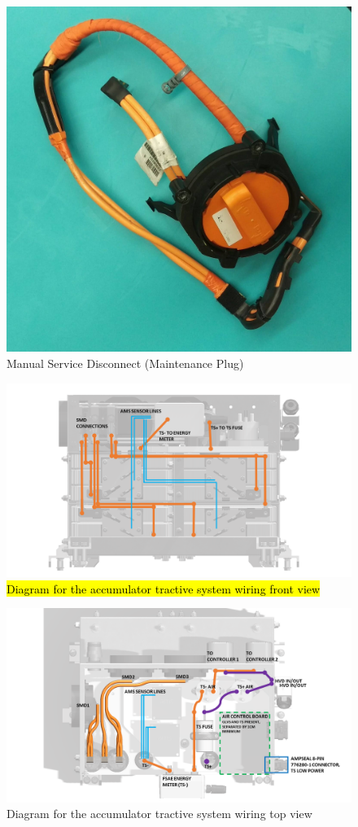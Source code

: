 \documentclass{article}
\DeclareRobustCommand{\hlr}[1]{{\sethlcolor{red}\hl{#1}}}
\begin{document}
            \begin{figure}[H]
                \centering
                \includegraphics[width = 0.5 \textwidth]{msd_highres}
                \caption{Manual Service Disconnect (Maintenance Plug)}
                \label{msd03}
            \end{figure}

            \begin{figure}[H]
                \centering
                \includegraphics[width = 0.5 \textwidth]{TRACTIVE_DIAGRAM_2}
                \caption{\hlr{Diagram for the accumulator tractive system wiring front view}}
                \label{tswiring_front}
            \end{figure}

            \begin{figure}[H]
                \centering
                \includegraphics[width = 0.5 \textwidth]{TRACTIVE_DIAGRAM_3}
                \caption{Diagram for the accumulator tractive system wiring top view }
                \label{tswiring_top}
            \end{figure}
\end{document}
